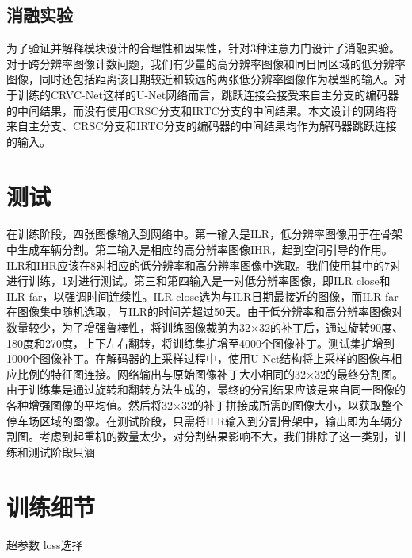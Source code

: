 \subsection{消融实验}
为了验证并解释模块设计的合理性和因果性，针对3种注意力门设计了消融实验。
对于跨分辨率图像计数问题，我们有少量的高分辨率图像和同日同区域的低分辨率图像，同时还包括距离该日期较近和较远的两张低分辨率图像作为模型的输入。对于训练的CRVC-Net这样的U-Net网络而言，跳跃连接会接受来自主分支的编码器的中间结果，而没有使用CRSC分支和IRTC分支的中间结果。本文设计的网络将来自主分支、CRSC分支和IRTC分支的编码器的中间结果均作为解码器跳跃连接的输入。

\section{测试}
在训练阶段，四张图像输入到网络中。第一输入是ILR，低分辨率图像用于在骨架中生成车辆分割。第二输入是相应的高分辨率图像IHR，起到空间引导的作用。ILR和IHR应该在8对相应的低分辨率和高分辨率图像中选取。我们使用其中的7对进行训练，1对进行测试。第三和第四输入是一对低分辨率图像，即ILR close和ILR far，以强调时间连续性。ILR close选为与ILR日期最接近的图像，而ILR far在图像集中随机选取，与ILR的时间差超过50天。由于低分辨率和高分辨率图像对数量较少，为了增强鲁棒性，将训练图像裁剪为32×32的补丁后，通过旋转90度、180度和270度，上下左右翻转，将训练集扩增至4000个图像补丁。测试集扩增到1000个图像补丁。在解码器的上采样过程中，使用U-Net结构将上采样的图像与相应比例的特征图连接。网络输出与原始图像补丁大小相同的32×32的最终分割图。由于训练集是通过旋转和翻转方法生成的，最终的分割结果应该是来自同一图像的各种增强图像的平均值。然后将32×32的补丁拼接成所需的图像大小，以获取整个停车场区域的图像。在测试阶段，只需将ILR输入到分割骨架中，输出即为车辆分割图。考虑到起重机的数量太少，对分割结果影响不大，我们排除了这一类别，训练和测试阶段只涵
\section{训练细节}
超参数
loss选择

